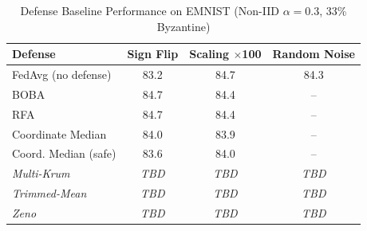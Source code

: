 
\begin{table}[t]
\centering
\caption{Defense Baseline Performance on EMNIST (Non-IID $\alpha=0.3$, 33\% Byzantine)}
\label{tab:defense_baselines}
\begin{tabular}{l c c c}
\toprule
\textbf{Defense} & \textbf{Sign Flip} & \textbf{Scaling $\times$100} & \textbf{Random Noise} \\
\midrule
FedAvg (no defense)       &  83.2 &  84.7 &  84.3 \\
BOBA                      &  84.7 &  84.4 &    -- \\
RFA                       &  84.7 &  84.4 &    -- \\
Coordinate Median         &  84.0 &  83.9 &    -- \\
Coord. Median (safe)      &  83.6 &  84.0 &    -- \\
\midrule
\textit{Multi-Krum}       & \textit{TBD} & \textit{TBD} & \textit{TBD} \\
\textit{Trimmed-Mean}     & \textit{TBD} & \textit{TBD} & \textit{TBD} \\
\textit{Zeno}             & \textit{TBD} & \textit{TBD} & \textit{TBD} \\
\bottomrule
\end{tabular}
\end{table}

